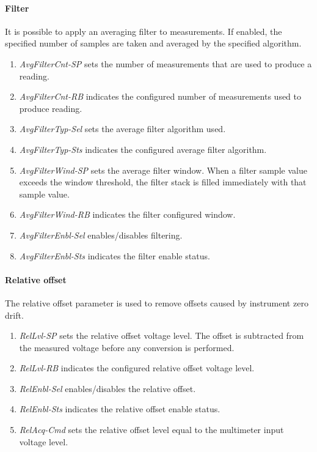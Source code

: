 \documentclass[openany]{article}
\begin{document}
		\paragraph{Filter} It is possible to apply an averaging filter to measurements. If enabled, the specified number of samples are taken and averaged by the specified algorithm.

			\begin{enumerate}
				\item \emph{AvgFilterCnt-SP} sets the number of measurements that are used to produce a reading.
				\item \emph{AvgFilterCnt-RB} indicates the configured number of measurements used to produce reading.
				\item \emph{AvgFilterTyp-Sel} sets the average filter algorithm used.
				\item \emph{AvgFilterTyp-Sts} indicates the configured average filter algorithm.
				\item \emph{AvgFilterWind-SP} sets the average filter window. When a filter sample value exceeds the window threshold, the filter stack is filled immediately with that sample value.
				\item \emph{AvgFilterWind-RB} indicates the filter configured window.
				\item \emph{AvgFilterEnbl-Sel} enables/disables filtering.
				\item \emph{AvgFilterEnbl-Sts} indicates the filter enable status.
			\end{enumerate}

		\paragraph{Relative offset}\label{relative-offset} The relative offset parameter is used to remove offsets caused by instrument zero drift.

			\begin{enumerate}
				\item \emph{RelLvl-SP} sets the relative offset voltage level. The offset is subtracted from the measured voltage before any conversion is performed.
				\item \emph{RelLvl-RB} indicates the configured relative offset voltage level.
				\item \emph{RelEnbl-Sel} enables/disables the relative offset.
				\item \emph{RelEnbl-Sts} indicates the relative offset enable status.
				\item \emph{RelAcq-Cmd} sets the relative offset level equal to the multimeter input voltage level.
			\end{enumerate}
\end{document}
